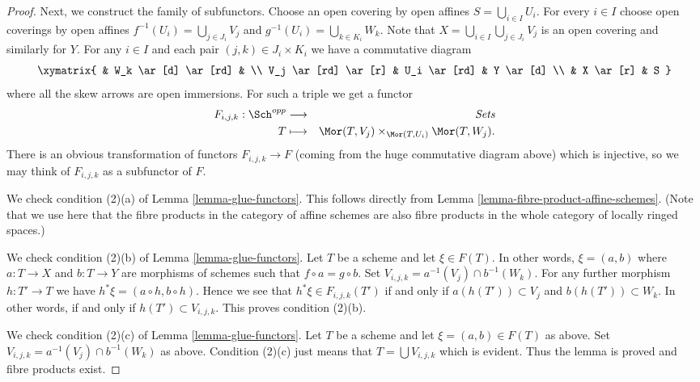 \begin{proof}
\medskip\noindent
Next, we construct the family of subfunctors.
Choose an open covering by open affines
$S = \bigcup\nolimits_{i \in I} U_i$.
For every $i \in I$ choose open coverings by open affines
$f^{-1}(U_i) = \bigcup\nolimits_{j \in J_i} V_j$ and
$g^{-1}(U_i) = \bigcup\nolimits_{k \in K_i} W_k$.
Note that $X = \bigcup_{i \in I} \bigcup_{j \in J_i} V_j$
is an open covering and similarly for $Y$.
For any $i \in I$ and each pair $(j, k) \in J_i \times K_i$
we have a commutative diagram
$$
\xymatrix{
    & W_k \ar[d] \ar[rd] &   \\
V_j \ar[rd] \ar[r] & U_i \ar[rd] & Y \ar[d] \\
    & X \ar[r]  & S
}
$$
where all the skew arrows are open immersions. For such a
triple we get a functor
\begin{eqnarray*}
F_{i, j, k} : \Sch^{opp} & \longrightarrow & \textit{Sets} \\
T & \longmapsto &
\Mor(T, V_j) \times_{\Mor(T, U_i)} \Mor(T, W_j).
\end{eqnarray*}
There is an obvious transformation of functors $F_{i, j, k} \to F$
(coming from the huge commutative diagram above)
which is injective, so we may think of $F_{i, j, k}$ as a subfunctor
of $F$.

\medskip\noindent
We check condition (2)(a) of Lemma \ref{lemma-glue-functors}.
This follows directly from Lemma \ref{lemma-fibre-product-affine-schemes}.
(Note that we use here that the fibre products in the category of
affine schemes are also fibre products in the whole category of locally
ringed spaces.)

\medskip\noindent
We check condition (2)(b) of Lemma \ref{lemma-glue-functors}.
Let $T$ be a scheme and let $\xi \in F(T)$. In other words,
$\xi = (a, b)$ where $a : T \to X$ and $b : T \to Y$ are
morphisms of schemes such that $f \circ a = g \circ b$.
Set $V_{i, j, k} = a^{-1}(V_j) \cap b^{-1}(W_k)$. For any
further morphism $h : T' \to T$ we have
$h^*\xi = (a \circ h, b \circ h)$. Hence we see that
$h^*\xi \in F_{i, j, k}(T')$ if and only if
$a(h(T')) \subset V_j$ and $b(h(T')) \subset W_k$.
In other words, if and only if $h(T') \subset V_{i, j, k}$.
This proves condition (2)(b).

\medskip\noindent
We check condition (2)(c) of Lemma \ref{lemma-glue-functors}.
Let $T$ be a scheme and let $\xi = (a, b) \in F(T)$ as above.
Set $V_{i, j, k} = a^{-1}(V_j) \cap b^{-1}(W_k)$ as above.
Condition (2)(c) just means that $T = \bigcup V_{i, j, k}$
which is evident. Thus the lemma is proved and fibre products
exist.
\end{proof}

